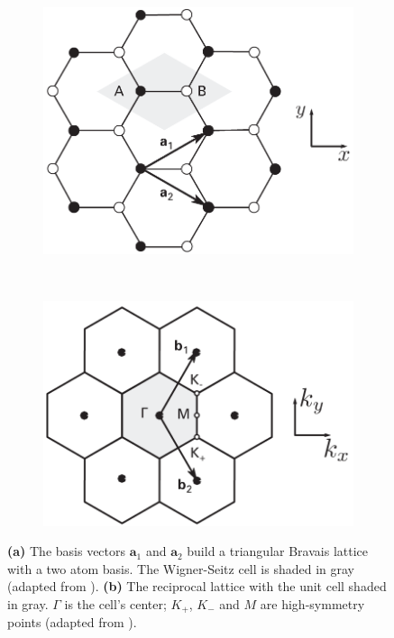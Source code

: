 \begin{figure}[!h]
  \centering
  \begin{subfigure}{0.45\textwidth}
    \includegraphics[width=\textwidth]{./images/cell.png}
  \end{subfigure}
  ~
  \begin{subfigure}{0.45\textwidth}
    \includegraphics[width=\textwidth]{./images/k-cell.png}
  \end{subfigure}
  \caption{\textbf{(a)} The basis vectors $\mathbf{a}_1$ and $\mathbf{a}_2$ build a triangular Bravais lattice with a two atom basis. The Wigner-Seitz cell is shaded in gray (adapted from \mcite). \textbf{(b)} The reciprocal lattice with the unit cell shaded in gray. $\Gamma$ is the cell's center; $K_+$, $K_-$ and $M$ are high-symmetry points (adapted from \mcite). }
  \label{fig:lattice}
\end{figure}


